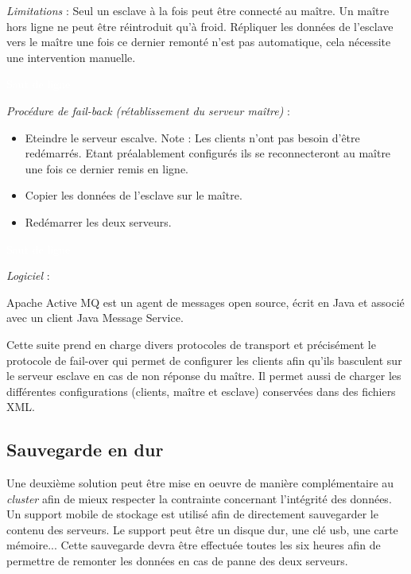 \textit{Limitations} :
Seul un esclave à la fois peut être connecté au maître.
Un maître hors ligne ne peut être réintroduit qu'à froid.
Répliquer les données de l'esclave vers le maître une fois ce dernier remonté n'est pas automatique, cela nécessite une intervention manuelle.

\textcolor{white}{Saut de ligne}

\textit{Procédure de fail-back (rétablissement du serveur maître)} :
\begin{itemize}
\item Eteindre le serveur escalve.
Note : Les clients n'ont pas besoin d'être redémarrés. Etant préalablement configurés ils se reconnecteront au maître une fois ce dernier remis en ligne.
\item Copier les données de l'esclave sur le maître.
\item Redémarrer les deux serveurs.
\end{itemize}

\textcolor{white}{Saut de ligne}

\textit{Logiciel} :

Apache Active MQ est un agent de messages open source, écrit en Java et associé avec un client Java Message Service. 

Cette suite prend en charge divers protocoles de transport et précisément le protocole de fail-over qui permet de configurer les clients afin qu'ils basculent sur le serveur esclave en cas de non réponse du maître. 
Il permet aussi de charger les différentes configurations (clients, maître et esclave) conservées dans des fichiers XML. 

\subsection{Sauvegarde en dur}

Une deuxième solution peut être mise en oeuvre de manière complémentaire au \textit{cluster} afin de mieux respecter la contrainte concernant l'intégrité des données.
Un support mobile de stockage est utilisé afin de directement sauvegarder le contenu des serveurs. Le support peut être un disque dur, une clé usb, une carte mémoire... 
Cette sauvegarde devra être effectuée toutes les six heures afin de permettre de remonter les données en cas de panne des deux serveurs.  
